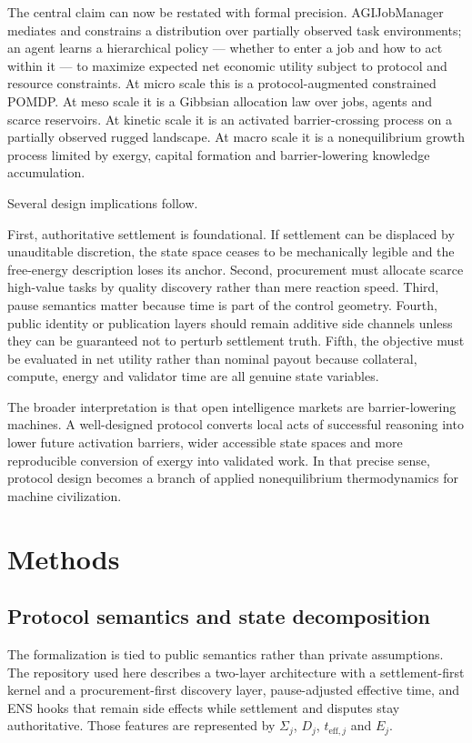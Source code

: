 The central claim can now be restated with formal precision.
AGIJobManager mediates and constrains a distribution over partially
observed task environments; an agent learns a hierarchical policy ---
whether to enter a job and how to act within it --- to maximize expected
net economic utility subject to protocol and resource constraints. At
micro scale this is a protocol-augmented constrained POMDP. At meso
scale it is a Gibbsian allocation law over jobs, agents and scarce
reservoirs. At kinetic scale it is an activated barrier-crossing process
on a partially observed rugged landscape. At macro scale it is a
nonequilibrium growth process limited by exergy, capital formation and
barrier-lowering knowledge accumulation.

Several design implications follow.

First, authoritative settlement is foundational. If settlement can be
displaced by unauditable discretion, the state space ceases to be
mechanically legible and the free-energy description loses its anchor.
Second, procurement must allocate scarce high-value tasks by quality
discovery rather than mere reaction speed. Third, pause semantics matter
because time is part of the control geometry. Fourth, public identity or
publication layers should remain additive side channels unless they can
be guaranteed not to perturb settlement truth. Fifth, the objective must
be evaluated in net utility rather than nominal payout because
collateral, compute, energy and validator time are all genuine state
variables.

The broader interpretation is that open intelligence markets are
barrier-lowering machines. A well-designed protocol converts local acts
of successful reasoning into lower future activation barriers, wider
accessible state spaces and more reproducible conversion of exergy into
validated work. In that precise sense, protocol design becomes a branch
of applied nonequilibrium thermodynamics for machine civilization.

\section{Methods}\label{methods}

\subsection{Protocol semantics and state
decomposition}\label{protocol-semantics-and-state-decomposition}

The formalization is tied to public semantics rather than private
assumptions. The repository used here describes a two-layer architecture
with a settlement-first kernel and a procurement-first discovery layer,
pause-adjusted effective time, and ENS hooks that remain side effects
while settlement and disputes stay authoritative. Those features are
represented by \(\Sigma_j\), \(D_j\), \(t_{\mathrm{eff},j}\) and
\(E_j\).

